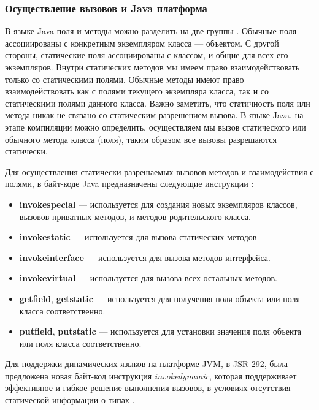 \subsubsection{Осуществление вызовов и Java платформа}

В языке Java поля и методы можно разделить на две группы \cite{java:horstmann2012core}. Обычные поля ассоциированы с конкретным экземпляром класса --- объектом. С другой стороны, статические поля ассоциированы с классом, и общие для всех его экземпляров. Внутри статических методов мы имеем право взаимодействовать только со статическими полями. Обычные методы имеют право взаимодействовать как с полями текущего экземпляра класса, так и со статическими полями данного класса. Важно заметить, что статичность поля или метода никак не связано со статическим разрешением вызова. В языке Java, на этапе компиляции можно определить, осуществляем мы вызов статического или обычного метода класса (поля), таким образом все вызовы разрешаются статически.

Для осуществления статически разрешаемых вызовов методов и взаимодействия с полями, в байт-коде Java предназначены следующие инструкции \cite{book:yellin1996java}:

\begin{itemize}
    \item \textbf{invokespecial} --- используется для создания новых экземпляров классов, вызовов приватных методов, и методов родительского класса.
    \item \textbf{invokestatic} --- используется для вызова статических методов
    \item \textbf{invokeinterface} --- используется для вызова методов интерфейса.
    \item \textbf{invokevirtual} --- используется для вызова всех остальных методов.
    \item \textbf{getfield}, \textbf{getstatic} --- используется для получения поля объекта или поля класса соответственно.
    \item \textbf{putfield}, \textbf{putstatic} --- используется для установки значения поля объекта или поля класса соответственно.
\end{itemize}


Для поддержки динамических языков на платформе JVM, в JSR 292, была предложена новая байт-код инструкция \textit{invokedynamic}, которая поддерживает эффективное и гибкое решение выполнения вызовов, в условиях отсутствия статической информации о типах \cite{java:JSR292rosejsr}.

